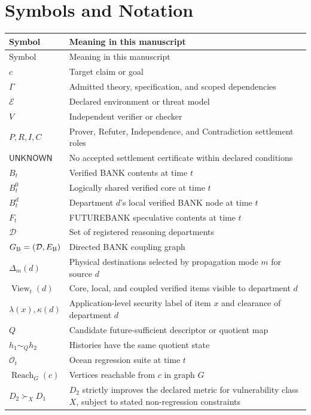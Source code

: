 \documentclass[11pt,oneside]{book}
\theoremstyle{definition}
\theoremstyle{remark}
\newcommand{\OCEAN}{\mathcal O}
\newcommand{\Reach}{\operatorname{Reach}}
\newcommand{\UNKNOWN}{\mathsf{UNKNOWN}}
\newcommand{\View}{\operatorname{View}}
\begin{document}
\chapter{Symbols and Notation}

\begin{longtable}{>{\raggedright\arraybackslash}p{}>{\raggedright\arraybackslash}p{}}
\toprule
Symbol & Meaning in this manuscript \\
\midrule
\endfirsthead
\toprule
Symbol & Meaning in this manuscript \\
\midrule
\endhead
\(c\) & Target claim or goal \\
\(\Gamma\) & Admitted theory, specification, and scoped dependencies \\
\(\mathcal E\) & Declared environment or threat model \\
\(V\) & Independent verifier or checker \\
\(P,R,I,C\) & Prover, Refuter, Independence, and Contradiction settlement roles \\
\(\UNKNOWN\) & No accepted settlement certificate within declared conditions \\
\(B_t\) & Verified BANK contents at time \(t\) \\
\(B_t^0\) & Logically shared verified core at time \(t\) \\
\(B_t^d\) & Department \(d\)'s local verified BANK node at time \(t\) \\
\(F_t\) & FUTUREBANK speculative contents at time \(t\) \\
\(\mathcal D\) & Set of registered reasoning departments \\
\(G_{\rm B}=(\mathcal D,E_{\rm B})\) & Directed BANK coupling graph \\
\(\Delta_m(d)\) & Physical destinations selected by propagation mode \(m\) for source \(d\) \\
\(\View_t(d)\) & Core, local, and coupled verified items visible to department \(d\) \\
\(\lambda(x),\kappa(d)\) & Application-level security label of item \(x\) and clearance of department \(d\) \\
\(Q\) & Candidate future-sufficient descriptor or quotient map \\
\(h_1\sim_Qh_2\) & Histories have the same quotient state \\
\(\OCEAN_t\) & Ocean regression suite at time \(t\) \\
\(\Reach_G(c)\) & Vertices reachable from \(c\) in graph \(G\) \\
\(D_2\succ_XD_1\) & \(D_2\) strictly improves the declared metric for vulnerability class \(X\), subject to stated non-regression constraints \\
\bottomrule
\end{longtable}
\end{document}
